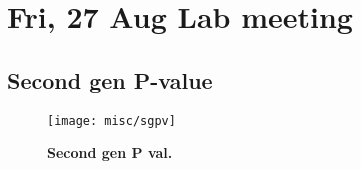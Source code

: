 \section{Fri, 27 Aug Lab meeting}
\subsection{Second gen P-value}
\begin{figure}[!h]
\begin{center}
  \texttt{[image: misc/sgpv]}
    \caption[Second gen P val]{\textbf{Second gen P val.} }
  \end{center}
\end{figure}

\lipsum[2-10]

